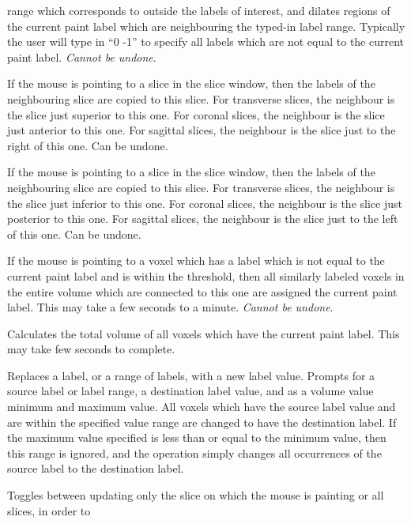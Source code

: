 \documentclass[11pt,letterpaper]{article}
\newcommand{\menutwo}[2]{{\scriptsize \fbox{\bf #1}/\fbox{\bf #2}}}
\begin{document}
\begin{description}
  range which corresponds to outside the labels of interest, and dilates
  regions of the current paint label which are neighbouring the typed-in
  label range. Typically the user will type in ``0 -1'' to specify all
  labels which are not equal to the current paint label. {\em Cannot be
    undone}.
\item[\menutwo{Segmenting}{Copy from Rt/Sup/Ant}] If the mouse is
  pointing to a slice in the slice window, then the labels of the
  neighbouring slice are copied to this slice.  For transverse slices,
  the neighbour is the slice just superior to this one.  For coronal
  slices, the neighbour is the slice just anterior to this one.  For
  sagittal slices, the neighbour is the slice just to the right of this
  one. Can be undone.
\item[\menutwo{Segmenting}{Copy from Lt/Inf/Pos}] If the mouse is
  pointing to a slice in the slice window, then the labels of the
  neighbouring slice are copied to this slice.  For transverse slices,
  the neighbour is the slice just inferior to this one.  For coronal
  slices, the neighbour is the slice just posterior to this one.  For
  sagittal slices, the neighbour is the slice just to the left of this
  one. Can be undone.
\item[\menutwo{Segmenting}{Fill 3D}] If the mouse is pointing to a voxel
  which has a label which is not equal to the current paint label and is
  within the threshold, then all similarly labeled voxels in the entire
  volume which are connected to this one are assigned the current paint
  label.  This may take a few seconds to a minute. {\em Cannot be undone}.
\item[\menutwo{Segmenting}{Calculate Volume}] Calculates the total
  volume of all voxels which have the current paint label. This may
  take few seconds to complete.
\item[\menutwo{Segmenting}{Change Labels}] Replaces a label, or a range of 
  labels, with a new label value. Prompts for a source label or label range, a
  destination label value, and as a volume value minimum and maximum
  value. All voxels which have the source label value and are within
  the specified value range are changed to have the destination label.
  If the maximum value specified is less than or equal to the minimum value,
  then this range is ignored, and the operation simply changes all
  occurrences of the source label to the destination label.
\item[\menutwo{Segmenting}{Fast Update}] Toggles between updating only
  the slice on which the mouse is painting or all slices, in order to

\end{description}
\end{document}
